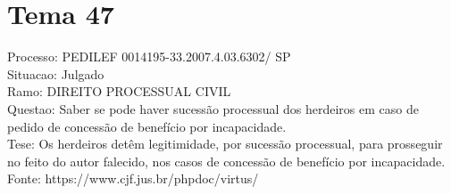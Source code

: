 \documentclass[12pt]{article}
\begin{document}
\section*{Tema 47}
Processo: PEDILEF 0014195-33.2007.4.03.6302/ SP\\
Situacao: Julgado\\
Ramo: DIREITO PROCESSUAL CIVIL\\
Questao: Saber se pode haver sucessão processual dos herdeiros em caso de pedido de concessão de benefício por incapacidade.\\
Tese: Os herdeiros detêm legitimidade, por sucessão processual, para prosseguir no feito do autor falecido, nos casos de concessão de benefício por incapacidade.\\
Fonte: https://www.cjf.jus.br/phpdoc/virtus/
\end{document}
